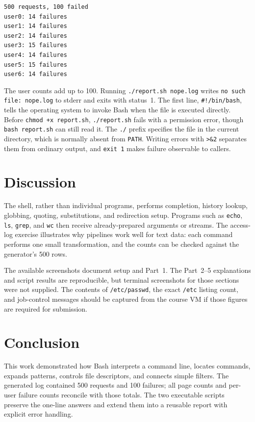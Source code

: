 \documentclass[12pt]{article}
\newcommand{\cmd}[1]{\texttt{#1}}
\begin{document}
\begin{lstlisting}
500 requests, 100 failed
user0: 14 failures
user1: 14 failures
user2: 14 failures
user3: 15 failures
user4: 14 failures
user5: 15 failures
user6: 14 failures
\end{lstlisting}

The user counts add up to 100. Running \cmd{./report.sh nope.log} writes \cmd{no such file: nope.log} to stderr and exits with status~1. The first line, \cmd{\#!/bin/bash}, tells the operating system to invoke Bash when the file is executed directly. Before \cmd{chmod +x report.sh}, \cmd{./report.sh} fails with a permission error, though \cmd{bash report.sh} can still read it. The \cmd{./} prefix specifies the file in the current directory, which is normally absent from \cmd{PATH}. Writing errors with \cmd{>\&2} separates them from ordinary output, and \cmd{exit 1} makes failure observable to callers.

\section{Discussion}
The shell, rather than individual programs, performs completion, history lookup, globbing, quoting, substitutions, and redirection setup. Programs such as \cmd{echo}, \cmd{ls}, \cmd{grep}, and \cmd{wc} then receive already-prepared arguments or streams. The access-log exercise illustrates why pipelines work well for text data: each command performs one small transformation, and the counts can be checked against the generator's 500 rows.

The available screenshots document setup and Part~1. The Part~2--5 explanations and script results are reproducible, but terminal screenshots for those sections were not supplied. The contents of \cmd{/etc/passwd}, the exact \cmd{/etc} listing count, and job-control messages should be captured from the course VM if those figures are required for submission.

\section{Conclusion}
This work demonstrated how Bash interprets a command line, locates commands, expands patterns, controls file descriptors, and connects simple filters. The generated log contained 500 requests and 100 failures; all page counts and per-user failure counts reconcile with those totals. The two executable scripts preserve the one-line answers and extend them into a reusable report with explicit error handling.
\end{document}
